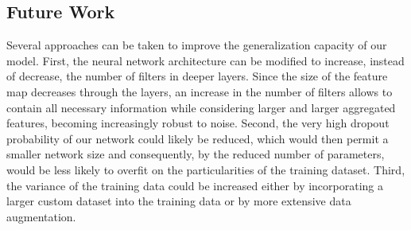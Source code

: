 \documentclass[a4paper]{article}
\begin{document}
\subsection{Future Work}
Several approaches can be taken to improve the generalization capacity of our model. First, the neural network architecture can be modified to increase, instead of decrease, the number of filters in deeper layers. Since the size of the feature map decreases through the layers, an increase in the number of filters allows to contain all necessary information while considering larger and larger aggregated features, becoming increasingly robust to noise. Second, the very high dropout probability of our network could likely be reduced, which would then permit a smaller network size and consequently, by the reduced number of parameters, would be less likely to overfit on the particularities of the training dataset. Third, the variance of the training data could be increased either by incorporating a larger custom dataset into the training data or by more  extensive data augmentation.


\end{document}
